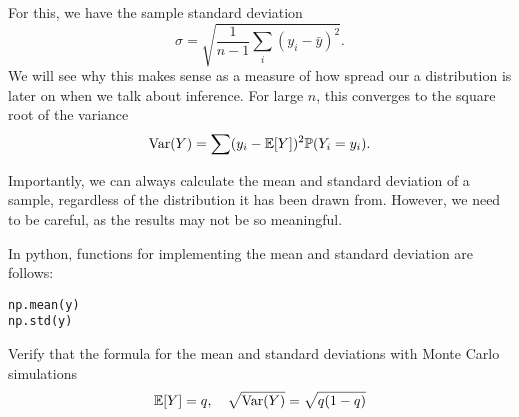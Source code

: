  
 For this, we have the {\dfn sample standard deviation}
\begin{equation}
\sigma = \sqrt{\frac{1}{n-1}\sum_{i}(y_i-\bar{y})^2}. 
\end{equation}
We will see why this makes sense as a measure of how spread our a distribution is later on when we talk about inference. For large $n$, this converges to the square root of the variance 
\begin{equation}
{\rm Var}(Y) = \sum (y_i - \mathbb E[Y])^2 \mathbb P(Y_i=y_i).
\end{equation} 



Importantly, we can always calculate the mean and standard deviation of a sample, regardless of the distribution it has been drawn from. However, we need to be careful, as the results may not be so meaningful. 




In python, functions for implementing the mean and standard deviation are follows:
\begin{Verbatim}
np.mean(y)
np.std(y)
\end{Verbatim}

%


\begin{example}
Verify that the formula for the mean and standard deviations with Monte Carlo simulations
\begin{align}\label{eq:bern_sts}
\mathbb E[Y] = q,\quad \sqrt{{\rm Var}(Y)} = \sqrt{q(1-q)}
\end{align}
\end{example}

